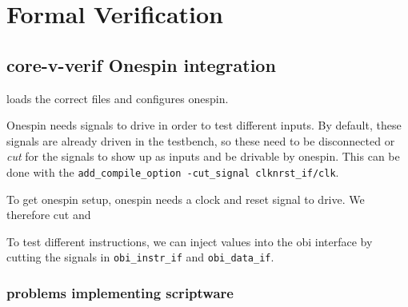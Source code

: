\chapter{Formal Verification}
\label{ch:formal}


\section{core-v-verif Onespin integration}

 loads the correct files and configures onespin. 


Onespin needs signals to drive in order to test different inputs. By default, these signals are already driven in the testbench, so these need to be disconnected or \textit{cut} for the signals to show up as inputs and be drivable by onespin. This can be done with the \lstinline{add_compile_option -cut_signal clknrst_if/clk}.

To get onespin setup, onespin needs a clock and reset signal to drive. We therefore cut  and 


To test different instructions, we can inject values into the obi interface by cutting the signals in \lstinline{obi_instr_if} and \lstinline{obi_data_if}.


\subsection{problems implementing scriptware}


